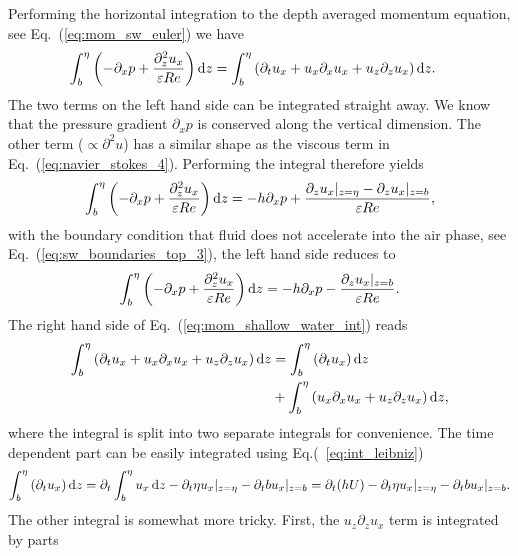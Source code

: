 Performing the horizontal integration to the depth averaged momentum equation, see Eq.~(\ref{eq:mom_sw_euler}) we have
\begin{align}\label{eq:mom_shallow_water_int}
    \int_b^{\eta}\left(-\partial_x p + \frac{\partial_z^2 u_x}{\varepsilon Re}\right)\mathop{}\!\mathrm{d} z &= \int_b^{\eta}\left(\partial_t u_x + u_x\partial_x u_x + u_z\partial_{z} u_x\right)\mathop{}\!\mathrm{d} z. 
\end{align}
The two terms on the left hand side can be integrated straight away. 
We know that the pressure gradient $\partial_x p$ is conserved along the vertical dimension. 
The other term ($\propto\partial^2 u$) has a similar shape as the viscous term in Eq.~(\ref{eq:navier_stokes_4}). 
Performing the integral therefore yields
\begin{equation}\label{eq:sw_mom_left}
    \int_b^{\eta}\left(-\partial_x p + \frac{\partial_z^2 u_x}{\varepsilon Re}\right)\mathop{}\!\mathrm{d} z = -h\partial_x p + \frac{\partial_z u_x|_{z = \eta} - \partial_z u_x|_{z=b}}{\varepsilon Re},
\end{equation}
with the boundary condition that fluid does not accelerate into the air phase, see Eq.~(\ref{eq:sw_boundaries_top_3}), the left hand side reduces to
\begin{equation}
    \int_b^{\eta}\left(-\partial_x p + \frac{\partial_z^2 u_x}{\varepsilon Re}\right)\mathop{}\!\mathrm{d} z = -h\partial_x p - \frac{\partial_z u_x|_{z=b}}{\varepsilon Re}.
\end{equation}
The right hand side of Eq.~(\ref{eq:mom_shallow_water_int}) reads
\begin{align}\label{eq:mom_shallow_rhs}
    \int_b^{\eta}\left(\partial_t u_x + u_x\partial_x u_x + u_z\partial_{z} u_x\right)\mathop{}\!\mathrm{d} z &= \int_b^{\eta}\left(\partial_t u_x\right)\mathop{}\!\mathrm{d} z \nonumber\\
    &+ \int_b^{\eta}\left(u_x\partial_x u_x + u_z\partial_{z} u_x\right)\mathop{}\!\mathrm{d} z ,
\end{align}
where the integral is split into two separate integrals for convenience.
The time dependent part can be easily integrated using Eq.(~\ref{eq:int_leibniz})
\begin{equation}\label{eq:first_term_rhs_mom_sw}
    \int_b^{\eta}\left(\partial_t u_x\right)\mathop{}\!\mathrm{d} z = \partial_t \int_b^{\eta} u_x \mathop{}\!\mathrm{d} z - \partial_t\eta u_x|_{z=\eta} - \partial_t b u_x|_{z=b} = \partial_t(hU) - \partial_t\eta u_x|_{z=\eta} - \partial_t b u_x|_{z=b}. 
\end{equation}
The other integral is somewhat more tricky.
First, the $u_z\partial_z u_x$ term is integrated by parts
